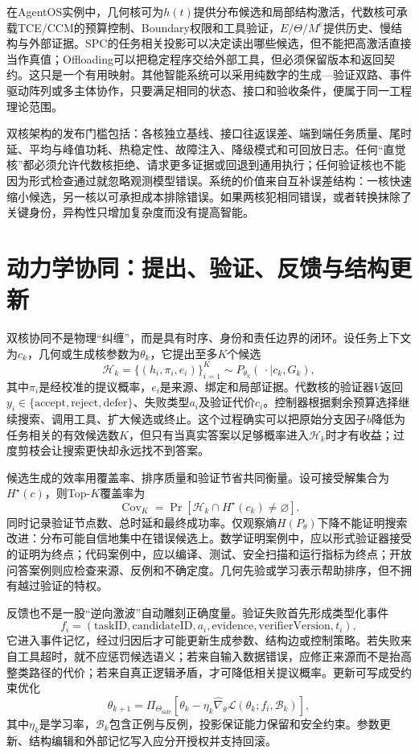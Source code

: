 在AgentOS实例中，几何核可为$h(t)$提供分布候选和局部结构激活，代数核可承载TCE/CCM的预算控制、Boundary权限和工具验证，$E/\Theta/M^e$提供历史、慢结构与外部证据。SPC的任务相关投影可以决定读出哪些候选，但不能把高激活直接当作真值；Offloading可以把稳定程序交给外部工具，但必须保留版本和返回契约。这只是一个有用映射。其他智能系统可以采用纯数字的生成—验证双路、事件驱动阵列或多主体协作，只要满足相同的状态、接口和验收条件，便属于同一工程理论范围。

双核架构的发布门槛包括：各核独立基线、接口往返误差、端到端任务质量、尾时延、平均与峰值功耗、热稳定性、故障注入、降级模式和可回放日志。任何“直觉核”都必须允许代数核拒绝、请求更多证据或回退到通用执行；任何验证核也不能因为形式检查通过就忽略观测模型错误。系统的价值来自互补误差结构：一核快速缩小候选，另一核以可承担成本排除错误。如果两核犯相同错误，或者转换抹除了关键身份，异构性只增加复杂度而没有提高智能。

\section{动力学协同：提出、验证、反馈与结构更新}
\label{sec:dynamic_synergy}

双核协同不是物理“纠缠”，而是具有时序、身份和责任边界的闭环。设任务上下文为$c_k$，几何或生成核参数为$\theta_k$，它提出至多$K$个候选
\[
\mathcal H_k=
\{(h_i,\pi_i,e_i)\}_{i=1}^{K}
\sim P_{\theta_k}(\,\cdot\mid c_k,G_k),
\]
其中$\pi_i$是经校准的提议概率，$e_i$是来源、绑定和局部证据。代数核的验证器$V$返回$y_i\in\{\mathrm{accept},\mathrm{reject},\mathrm{defer}\}$、失败类型$a_i$及验证代价$c_i$。控制器根据剩余预算选择继续搜索、调用工具、扩大候选或终止。这个过程确实可以把原始分支因子$b$降低为任务相关的有效候选数$K$，但只有当真实答案以足够概率进入$\mathcal H_k$时才有收益；过度剪枝会让搜索更快却永远找不到答案。

候选生成的效率用覆盖率、排序质量和验证节省共同衡量。设可接受解集合为$H^\star(c)$，则Top-$K$覆盖率为
\[
\operatorname{Cov}_K=
\Pr\!\left[\mathcal H_k\cap H^\star(c_k)\neq\varnothing\right].
\]
同时记录验证节点数、总时延和最终成功率。仅观察熵$H(P_\theta)$下降不能证明搜索改进：分布可能自信地集中在错误候选上。数学证明案例中，应以形式验证器接受的证明为终点；代码案例中，应以编译、测试、安全扫描和运行指标为终点；开放问答案例则应检查来源、反例和不确定度。几何先验或学习表示帮助排序，但不拥有越过验证的特权。

反馈也不是一股“逆向激波”自动雕刻正确度量。验证失败首先形成类型化事件
\[
f_i=(\mathrm{taskID},\mathrm{candidateID},a_i,
\mathrm{evidence},\mathrm{verifierVersion},t_i),
\]
它进入事件记忆，经过归因后才可能更新生成参数、结构边或控制策略。若失败来自工具超时，就不应惩罚候选语义；若来自输入数据错误，应修正来源而不是抬高整类路径的代价；若来自真正逻辑矛盾，才可降低相关提议概率。更新可写成受约束优化
\[
\theta_{k+1}=
\Pi_{\Theta_{\mathrm{safe}}}
\left[
\theta_k-\eta_k
\widehat\nabla_\theta
\mathcal L(\theta_k;f_i,\mathcal B_k)
\right],
\]
其中$\eta_k$是学习率，$\mathcal B_k$包含正例与反例，投影保证能力保留和安全约束。参数更新、结构编辑和外部记忆写入应分开授权并支持回滚。

